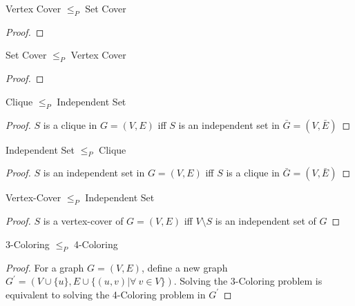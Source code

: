 					\begin{lemma}
						Vertex Cover $\le_P$ Set Cover
					\end{lemma}

					\begin{proof}
						
					\end{proof}

					\begin{lemma}
						Set Cover $\le_P$ Vertex Cover
					\end{lemma}

					\begin{proof}
						
					\end{proof}

					\begin{lemma}
						Clique $\le_P$ Independent Set
					\end{lemma}

					\begin{proof}
						$S$ is a clique in $G = (V, E)$ iff $S$ is an independent set in $\bar{G} = (V, \bar{E})$
					\end{proof}

					\begin{lemma}
						Independent Set $\le_P$ Clique
					\end{lemma}

					\begin{proof}
						$S$ is an independent set in $G = (V, E)$ iff $S$ is a clique in $\bar{G} = (V, \bar{E})$
					\end{proof}

					\begin{lemma}
						Vertex-Cover $\le_P$ Independent Set
					\end{lemma}

					\begin{proof}
						$S$ is a vertex-cover of $G = (V, E)$ iff $V \setminus S$ is an independent set of $G$
					\end{proof}

					\begin{lemma}
						3-Coloring $\le_P$ 4-Coloring
					\end{lemma}

					\begin{proof}
						For a graph $G = (V, E)$, define a new graph $G^\prime = (V \cup \{u\}, E \cup \{(u, v) | \forall ~ v \in V\})$. Solving the 3-Coloring problem is equivalent to solving the 4-Coloring problem in $G^\prime$
					\end{proof}

